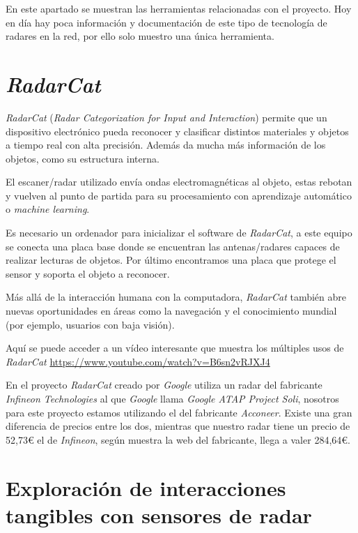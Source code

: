 
En este apartado se muestran las herramientas relacionadas con el proyecto.
Hoy en día hay poca información y documentación de este tipo de tecnología de radares en la red, por ello solo muestro una única herramienta.

\section{\textit{RadarCat}}
\textit{RadarCat} (\textit{Radar Categorization for Input and Interaction}) permite que un dispositivo electrónico pueda reconocer y clasificar distintos materiales y objetos a tiempo real con alta precisión. Además da mucha más información de los objetos, como su estructura interna.

El escaner/radar utilizado envía ondas electromagnéticas al objeto, estas rebotan y vuelven al punto de partida para su procesamiento con aprendizaje automático o \textit{machine learning}.

Es necesario un ordenador para inicializar el software de \textit{RadarCat}, a este equipo se conecta una placa base donde se encuentran las antenas/radares capaces de realizar lecturas de objetos.
Por último encontramos una placa que protege el sensor y soporta el objeto a reconocer.

Más allá de la interacción humana con la computadora, \textit{RadarCat} también abre nuevas oportunidades en áreas como la navegación y el conocimiento mundial (por ejemplo, usuarios con baja visión).

Aquí se puede acceder a un vídeo interesante que muestra los múltiples usos de \textit{RadarCat} \url{https://www.youtube.com/watch?v=B6sn2vRJXJ4}

En el proyecto \textit{RadarCat} creado por \textit{Google} utiliza un radar del fabricante \textit{Infineon Technologies} al que \textit{Google} llama \textit{Google ATAP Project Soli}, nosotros para este proyecto estamos utilizando el del fabricante \textit{Acconeer}. Existe una gran diferencia de precios entre los dos, mientras que nuestro radar tiene un precio de 52,73€ el de \textit{Infineon}, según muestra la web del fabricante, llega a valer 284,64€.


\section{Exploración de interacciones tangibles con sensores de radar}

